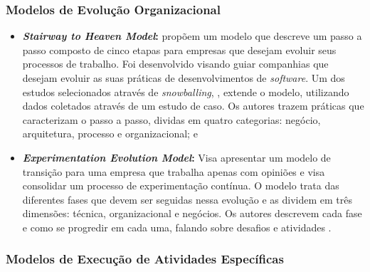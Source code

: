 \subsubsection{Modelos de Evolução Organizacional}

\begin{itemize}
    
    \item \textbf{\textit{Stairway to Heaven Model}:}  propõem um modelo que descreve um passo a passo composto de cinco etapas para empresas que desejam evoluir seus processos de trabalho. Foi desenvolvido visando guiar companhias que desejam evoluir as suas práticas de desenvolvimentos de \textit{software}. Um dos estudos selecionados através de \textit{snowballing}, , extende o modelo, utilizando dados coletados através de um estudo de caso. Os autores trazem práticas que caracterizam o passo a passo, dividas em quatro categorias: negócio, arquitetura, processo e organizacional; e
    
    \item \textbf{\textit{Experimentation Evolution Model}:} Visa apresentar um modelo de transição para uma empresa que trabalha apenas com opiniões e visa consolidar um processo de experimentação contínua. O modelo trata das diferentes fases que devem ser seguidas nessa evolução e as dividem em três dimensões: técnica, organizacional e negócios. Os autores descrevem cada fase e como se progredir em cada uma, falando sobre desafios e atividades .
    
\end{itemize}


\subsubsection{Modelos de Execução de Atividades Específicas}

